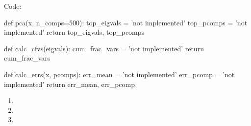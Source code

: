 \documentclass[submit]{harvardml}
\begin{document}
Code:

\begin{python}
def pca(x, n_comps=500):
    top_eigvals = 'not implemented'
    top_pcomps = 'not implemented'
    return top_eigvals, top_pcomps


def calc_cfvs(eigvals):
    cum_frac_vars = 'not implemented'
    return cum_frac_vars


def calc_errs(x, pcomps):
    err_mean = 'not implemented'
    err_pcomp = 'not implemented'
    return err_mean, err_pcomp
\end{python}

\begin{enumerate}
  \item 
  \item 
  \item 
\end{enumerate}

\newpage
\end{document}
